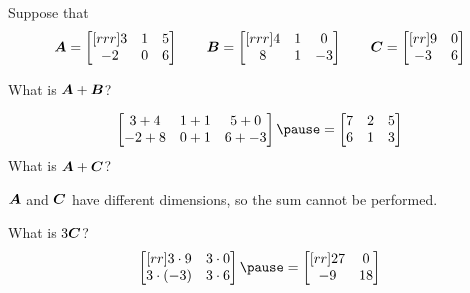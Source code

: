 \documentclass{beamer}
\begin{document}
\begin{frame}
\begin{example}
Suppose that
\begin{equation*}
\boldsymbol{A}=
\begin{bmatrix}[rrr]
3 & 1 & 5 \\
-2 & 0 & 6 \\
\end{bmatrix}\qquad
\boldsymbol{B}=
\begin{bmatrix}[rrr]
4 & 1 & 0 \\
8 & 1 & -3 \\
\end{bmatrix}\qquad
\boldsymbol{C}=
\begin{bmatrix}[rr]
9 & 0 \\
-3 & 6 \\
\end{bmatrix}
\end{equation*}\pause

\vspace{-5mm}
What is $\boldsymbol{A}+\boldsymbol{B}$?\pause

\vspace{-4mm}
\begin{equation*}
\begin{bmatrix}
3+4 & 1+1 & 5+0 \\
-2+8 & 0+1 & 6+-3 \\
\end{bmatrix}\pause
=
\begin{bmatrix}
7 & 2 & 5 \\
6 & 1 & 3 \\
\end{bmatrix}
\end{equation*}\pause
What is $\boldsymbol{A}+\boldsymbol{C}$?\pause

\vspace{-3mm}
\begin{center}
$\boldsymbol{A}$ and $\boldsymbol{C}$ have different dimensions, so the sum cannot be performed.\pause
\end{center}

\vspace{-2mm}
What is $3\boldsymbol{C}$?\pause
\begin{equation*}
\begin{bmatrix}[rr]
3\cdot 9 & 3\cdot 0 \\
3\cdot (-3) & 3\cdot 6 \\
\end{bmatrix}\pause
=
\begin{bmatrix}[rr]
27 & 0 \\
-9 & 18 \\
\end{bmatrix}
\end{equation*}\pause


\end{example}
\end{frame}
\end{document}
